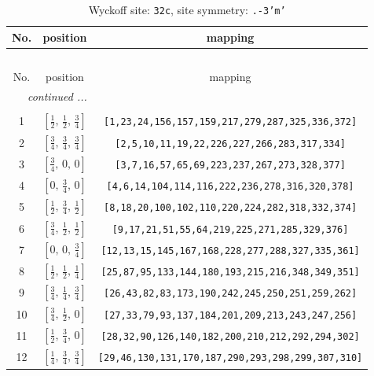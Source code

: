 \documentclass[fleqn,8pt]{jsarticle}
\begin{document}
\begin{longtable}{ccc}
\caption{Wyckoff site: {\tt 32c}, site symmetry: {\tt .-3'm'}}
 \\
 \hline \hline
No. & position & mapping \\ \hline \endfirsthead

\multicolumn{2}{l}{\tablename\ \thetable{}} \\
 \hline \hline
No. & position & mapping \\ \hline \endhead

 \hline \hline
\multicolumn{2}{r}{\footnotesize\it continued ...} \\ \endfoot

 \hline \hline
\multicolumn{2}{r}{} \\ \endlastfoot

1 & $\left[ \frac{1}{2},\, \frac{1}{2},\, \frac{3}{4} \right]$ & {\tt [1,23,24,156,157,159,217,279,287,325,336,372]} \\ \hline
2 & $\left[ \frac{3}{4},\, \frac{3}{4},\, \frac{3}{4} \right]$ & {\tt [2,5,10,11,19,22,226,227,266,283,317,334]} \\ \hline
3 & $\left[ \frac{3}{4},\, 0,\, 0 \right]$ & {\tt [3,7,16,57,65,69,223,237,267,273,328,377]} \\ \hline
4 & $\left[ 0,\, \frac{3}{4},\, 0 \right]$ & {\tt [4,6,14,104,114,116,222,236,278,316,320,378]} \\ \hline
5 & $\left[ \frac{1}{2},\, \frac{3}{4},\, \frac{1}{2} \right]$ & {\tt [8,18,20,100,102,110,220,224,282,318,332,374]} \\ \hline
6 & $\left[ \frac{3}{4},\, \frac{1}{2},\, \frac{1}{2} \right]$ & {\tt [9,17,21,51,55,64,219,225,271,285,329,376]} \\ \hline
7 & $\left[ 0,\, 0,\, \frac{3}{4} \right]$ & {\tt [12,13,15,145,167,168,228,277,288,327,335,361]} \\ \hline
8 & $\left[ \frac{1}{2},\, \frac{1}{2},\, \frac{1}{4} \right]$ & {\tt [25,87,95,133,144,180,193,215,216,348,349,351]} \\ \hline
9 & $\left[ \frac{3}{4},\, \frac{1}{4},\, \frac{3}{4} \right]$ & {\tt [26,43,82,83,173,190,242,245,250,251,259,262]} \\ \hline
10 & $\left[ \frac{3}{4},\, \frac{1}{2},\, 0 \right]$ & {\tt [27,33,79,93,137,184,201,209,213,243,247,256]} \\ \hline
11 & $\left[ \frac{1}{2},\, \frac{3}{4},\, 0 \right]$ & {\tt [28,32,90,126,140,182,200,210,212,292,294,302]} \\ \hline
12 & $\left[ \frac{1}{4},\, \frac{3}{4},\, \frac{3}{4} \right]$ & {\tt [29,46,130,131,170,187,290,293,298,299,307,310]} \\ \hline

\end{longtable}
\end{document}
